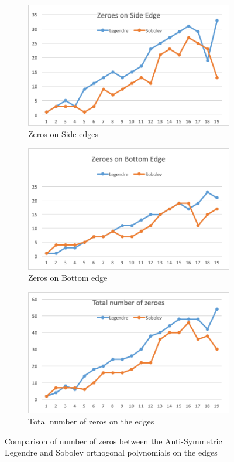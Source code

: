\documentclass[12pt]{amsart}
\theoremstyle{plain}
\theoremstyle{definition}
\begin{document}
\begin{figure}[H]
    \centering
    \begin{subfigure}{\linewidth}
    \centering
    \includegraphics[width=0.65\linewidth]{images/SEzeroes.png}
    \caption{Zeros on Side edges}
    \label{subfig:zerosonsideedgeantisymmetric}
    \end{subfigure}
    \begin{subfigure}{\linewidth}
    \centering
    \includegraphics[width=0.65\linewidth]{images/BEzeroes.png}
    \caption{Zeros on Bottom edge}
    \label{subfig:zerosonbottomedgeantisymmetric}
    \end{subfigure}
    \begin{subfigure}{\linewidth}
    \centering
    \includegraphics[width=0.65\linewidth]{images/TotalZeroes.png}
    \caption{Total number of zeros on the edges}
    \label{subfig:zerostotalantisymmetric}
    \end{subfigure}
    \caption{Comparison of number of zeros between the Anti-Symmetric Legendre and Sobolev orthogonal polynomials on the edges}
    \label{fig: edgezeros}
\end{figure}
\end{document}
